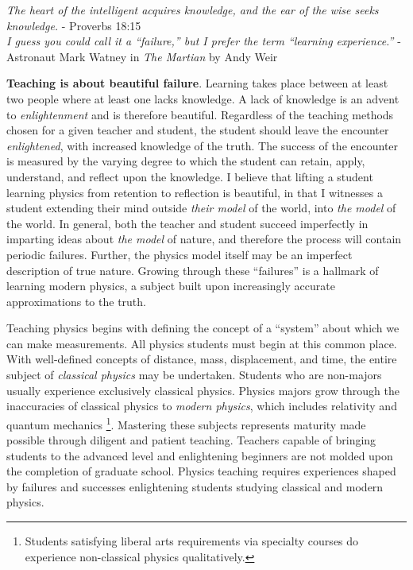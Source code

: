 \documentclass[../../main.tex]{subfiles}
\begin{document}
\epigraph{\textit{The heart of the intelligent acquires knowledge, and the ear of the wise seeks knowledge.} - Proverbs 18:15 \\ \vspace{0.1cm} \textit{I guess you could call it a ``failure,'' but I prefer the term ``learning experience.''} - Astronaut Mark Watney in \textit{The Martian} by Andy Weir}{}

\textbf{Teaching is about beautiful failure}.  Learning takes place between at least two people where at least one lacks knowledge.  A lack of knowledge is an advent to \textit{enlightenment} and is therefore beautiful.  Regardless of the teaching methods chosen for a given teacher and student, the student should leave the encounter \textit{enlightened}, with increased knowledge of the truth.  The success of the encounter is measured by the varying degree to which the student can retain, apply, understand, and reflect upon the knowledge.  I believe that lifting a student learning physics from retention to reflection is beautiful, in that I witnesses a student extending their mind outside \textit{their model} of the world, into \textit{the model} of the world.  In general, both the teacher and student succeed imperfectly in imparting ideas about \textit{the model} of nature, and therefore the process will contain periodic failures.  Further, the physics model itself may be an imperfect description of true nature.  Growing through these ``failures'' is a hallmark of learning modern physics, a subject built upon increasingly accurate approximations to the truth. \\ \hspace{0.1cm}

Teaching physics begins with defining the concept of a ``system'' about which we can make measurements.  All physics students must begin at this common place.  With well-defined concepts of distance, mass, displacement, and time, the entire subject of \textit{classical physics} may be undertaken.  Students who are non-majors usually experience exclusively classical physics.  Physics majors grow through the inaccuracies of classical physics to \textit{modern physics}, which includes relativity and quantum mechanics \footnote{Students satisfying liberal arts requirements via specialty courses do experience non-classical physics qualitatively.}.  Mastering these subjects represents maturity made possible through diligent and patient teaching.  Teachers capable of bringing students to the advanced level and enlightening beginners are not molded upon the completion of graduate school.  Physics teaching requires experiences shaped by failures and successes enlightening students studying classical and modern physics. \\ \hspace{0.1cm}
\end{document}

